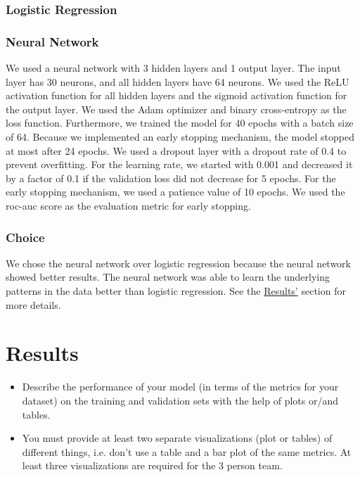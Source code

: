\documentclass[a4, 10 pt, conference]{ieeeconf}  %
\begin{document}
\subsubsection{Logistic Regression}

\subsubsection{Neural Network}
We used a neural network with 3 hidden layers and 1 output layer. The input layer has 30 neurons, and all hidden layers have 64 neurons. We used the ReLU activation function for all hidden layers and the sigmoid activation function for the output layer. We used the Adam optimizer and binary cross-entropy as the loss function. Furthermore, we trained the
model for 40 epochs with a batch size of 64. Because we implemented an early stopping mechanism, the model stopped at most after 24 epochs. We used a dropout layer with a dropout rate of 0.4 to prevent overfitting. For the learning rate, we started with 0.001 and decreased it by a factor of 0.1 if the validation loss did not decrease for 5 epochs.
For the early stopping mechanism, we used a patience value of 10 epochs. We used the roc-auc score as the evaluation metric for early stopping.

\subsubsection{Choice}
We chose the neural network over logistic regression because the neural network showed better results. The neural network was able to learn the underlying patterns in the data better than logistic regression.
See the \hyperref[sec:results]{Results'} section for more details.

\section{Results}
\label{sec:results}

{\color{blue}

  \begin{itemize}
    \item Describe the performance of your model (in terms of the metrics for your dataset) on the training and validation sets with the help of plots or/and tables.
    \item You must provide at least two separate visualizations
          (plot or tables) of different things, i.e. don’t use a table
          and a bar plot of the same metrics. At least three
          visualizations are required for the 3 person team.
  \end{itemize}
}
\end{document}
